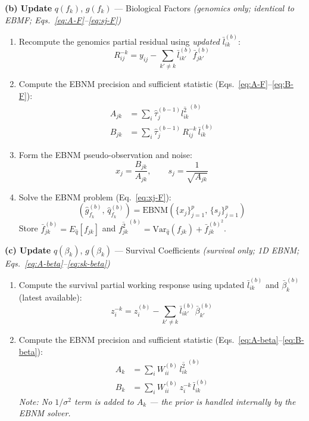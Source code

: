 \documentclass{article}[12pt]
\newcommand{\lbar}[2]{\bar{l}_{#1#2}}
\newcommand{\fbar}[2]{\bar{f}_{#1#2}}
\newcommand{\bbar}[1]{\bar{\beta}_{#1}}
\newcommand{\lsec}[2]{\overline{l^{2}_{#1#2}}}
\newcommand{\fsec}[2]{\overline{f^{2}_{#1#2}}}
\begin{document}
\begin{tcolorbox}[
  breakable,
  colback=gray!4!white, colframe=black!70,
  title={\textbf{Algorithm 1.} Supervised MF --- CAVI Update Procedure},
  fonttitle=\bfseries, left=6pt, right=6pt, top=6pt, bottom=6pt
]
\medskip
\textbf{(b) Update} $q(f_k)$, $g(f_k)$ --- Biological Factors
\quad\emph{(genomics only; identical to EBMF; Eqs.~\ref{eq:A-F}--\ref{eq:sj-F})}

\begin{enumerate}[label=\textbf{b.\arabic*.}, leftmargin=2cm]
    \item Recompute the genomics partial residual using \emph{updated} $\lbar{i}{k}^{(b)}$:
    \[
        R^{-k}_{ij} = y_{ij} - \sum_{k'\neq k}\lbar{i}{k'}^{(b)}\fbar{j}{k'}^{(b)}
    \]

    \item Compute the EBNM precision and sufficient statistic
    (Eqs.~\ref{eq:A-F}--\ref{eq:B-F}):
    \begin{align*}
        A_{jk} &= \sum_i \hat{\tau}_j^{(b-1)}\lsec{i}{k}^{(b)}\\
        B_{jk} &= \sum_i \hat{\tau}_j^{(b-1)}\,R^{-k}_{ij}\,\lbar{i}{k}^{(b)}
    \end{align*}

    \item Form the EBNM pseudo-observation and noise:
    \[
        x_j = \frac{B_{jk}}{A_{jk}}, \qquad s_j = \frac{1}{\sqrt{A_{jk}}}
    \]

    \item Solve the EBNM problem (Eq.~\ref{eq:xj-F}):
    \[
        \left(\hat{g}_{f_k}^{(b)},\,\hat{q}_{f_k}^{(b)}\right)
        = \mathrm{EBNM}\!\left(\{x_j\}_{j=1}^p,\,\{s_j\}_{j=1}^p\right)
    \]
    Store $\fbar{j}{k}^{(b)} = E_{\hat{q}}[f_{jk}]$ and
    $\fsec{j}{k}^{(b)} = \mathrm{Var}_{\hat{q}}(f_{jk}) + \fbar{j}{k}^{(b)^2}$.
\end{enumerate}

\medskip
\textbf{(c) Update} $q(\beta_k)$, $g(\beta_k)$ --- Survival Coefficients
\quad\emph{(survival only; 1D EBNM; Eqs.~\ref{eq:A-beta}--\ref{eq:sk-beta})}

\begin{enumerate}[label=\textbf{c.\arabic*.}, leftmargin=2cm]
    \item Compute the survival partial working response using updated
    $\lbar{i}{k}^{(b)}$ and $\bbar{k}^{(b)}$ (latest available):
    \[
        z^{-k}_i = z_i^{(b)} - \sum_{k'\neq k}\lbar{i}{k'}^{(b)}\bbar{k'}^{(b)}
    \]

    \item Compute the EBNM precision and sufficient statistic
    (Eqs.~\ref{eq:A-beta}--\ref{eq:B-beta}):
    \begin{align*}
        A_k &= \sum_i W_{ii}^{(b)}\,\lsec{i}{k}^{(b)}\\
        B_k &= \sum_i W_{ii}^{(b)}\,z^{-k}_i\,\lbar{i}{k}^{(b)}
    \end{align*}
    \emph{Note: No $1/\sigma^2$ term is added to $A_k$ --- the prior is
    handled internally by the EBNM solver.}


\end{enumerate}
\end{tcolorbox}
\end{document}
